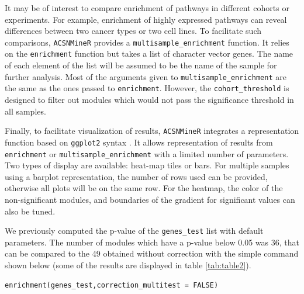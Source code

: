 \documentclass{article}
\begin{document}
It may be of interest to compare enrichment of pathways in different cohorts or
experiments. For example, enrichment of highly expressed pathways can reveal
differences between two cancer types or two cell lines.  To facilitate such
comparisons, \verb|ACSNMineR| provides a \verb|multisample_enrichment| function.
It relies on the \verb|enrichment| function but takes a list of character
vector genes. The name of each element of the list will be assumed to be the
name of the sample for further analysis.  Most of the arguments given to
\verb|multisample_enrichment| are the same as the ones passed to
\verb|enrichment|. However, the \verb|cohort_threshold| is designed to filter
out modules which would not pass the significance threshold in all samples.   

Finally, to facilitate visualization of results, \verb|ACSNMineR| integrates a
representation function based on \verb|ggplot2| syntax \cite{ggplot2}. It
allows representation of results from \verb|enrichment| or
\verb|multisample_enrichment| with a limited number of parameters. Two types of
display are available: heat-map tiles or bars. For multiple samples using a
barplot representation, the number of rows used can be provided, otherwise all
plots will be on the same row. For the heatmap, the color of the
non-significant modules, and boundaries of the gradient for significant values
can also be tuned.

We previously computed the p-value of the \verb|genes_test| list with default
parameters. The number of modules which have a p-value below 0.05 was 36, that
can be compared to the 49 obtained without correction with the simple command
shown below (some of the results are displayed in table \ref{tab:table2}).


\begin{verbatim}
enrichment(genes_test,correction_multitest = FALSE)
\end{verbatim}
\end{document}
